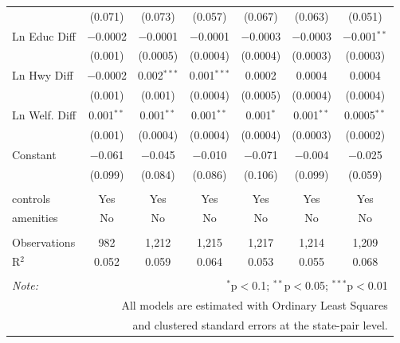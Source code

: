 \begin{table}[!htbp]
\begin{tabular}{@{\extracolsep{5pt}}lcccccc}
  & (0.071) & (0.073) & (0.057) & (0.067) & (0.063) & (0.051) \\ 
  Ln Educ Diff & $-$0.0002 & $-$0.0001 & $-$0.0001 & $-$0.0003 & $-$0.0003 & $-$0.001$^{**}$ \\ 
  & (0.001) & (0.0005) & (0.0004) & (0.0004) & (0.0003) & (0.0003) \\ 
  Ln Hwy Diff & $-$0.0002 & 0.002$^{***}$ & 0.001$^{***}$ & 0.0002 & 0.0004 & 0.0004 \\ 
  & (0.001) & (0.001) & (0.0004) & (0.0005) & (0.0004) & (0.0004) \\ 
  Ln Welf. Diff & 0.001$^{**}$ & 0.001$^{**}$ & 0.001$^{**}$ & 0.001$^{*}$ & 0.001$^{**}$ & 0.0005$^{**}$ \\ 
  & (0.001) & (0.0004) & (0.0004) & (0.0004) & (0.0003) & (0.0002) \\ 
  Constant & $-$0.061 & $-$0.045 & $-$0.010 & $-$0.071 & $-$0.004 & $-$0.025 \\ 
  & (0.099) & (0.084) & (0.086) & (0.106) & (0.099) & (0.059) \\ 
 \hline \\[-1.8ex] 
controls & Yes & Yes & Yes & Yes & Yes & Yes \\ 
amenities & No & No & No & No & No & No \\ 
\hline \\[-1.8ex] 
Observations & 982 & 1,212 & 1,215 & 1,217 & 1,214 & 1,209 \\ 
R$^{2}$ & 0.052 & 0.059 & 0.064 & 0.053 & 0.055 & 0.068 \\ 
\hline 
\hline \\[-1.8ex] 
\textit{Note:}  & \multicolumn{6}{r}{$^{*}$p$<$0.1; $^{**}$p$<$0.05; $^{***}$p$<$0.01} \\ 
 & \multicolumn{6}{r}{All models are estimated with Ordinary Least Squares} \\ 
 & \multicolumn{6}{r}{and clustered standard errors at the state-pair level.} \\ 
\end{tabular} 
\end{table} 

